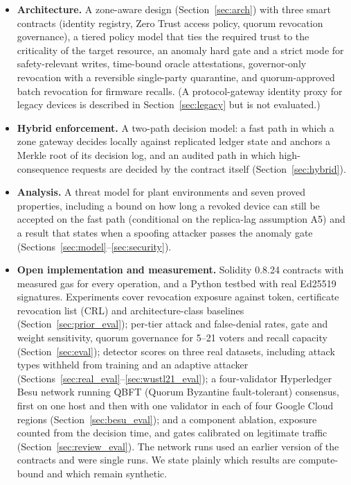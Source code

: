 \begin{itemize}[leftmargin=1.1em,itemsep=0pt,topsep=1pt]
  \item \textbf{Architecture.} A zone-aware design (Section~\ref{sec:arch}) with three smart contracts (identity registry, Zero Trust access policy, quorum revocation governance), a tiered policy model that ties the required trust to the criticality of the target resource, an anomaly hard gate and a strict mode for safety-relevant writes, time-bound oracle attestations, governor-only revocation with a reversible single-party quarantine, and quorum-approved batch revocation for firmware recalls. (A protocol-gateway identity proxy for legacy devices is described in Section~\ref{sec:legacy} but is not evaluated.)
  \item \textbf{Hybrid enforcement.} A two-path decision model: a fast path in which a zone gateway decides locally against replicated ledger state and anchors a Merkle root of its decision log, and an audited path in which high-consequence requests are decided by the contract itself (Section~\ref{sec:hybrid}).
  \item \textbf{Analysis.} A threat model for plant environments and seven proved properties, including a bound on how long a revoked device can still be accepted on the fast path (conditional on the replica-lag assumption A5) and a result that states when a spoofing attacker passes the anomaly gate (Sections~\ref{sec:model}--\ref{sec:security}).
  \item \textbf{Open implementation and measurement.} Solidity 0.8.24 contracts with measured gas for every operation, and a Python testbed with real Ed25519 signatures. Experiments cover revocation exposure against token, certificate revocation list (CRL) and architecture-class baselines (Section~\ref{sec:prior_eval}); per-tier attack and false-denial rates, gate and weight sensitivity, quorum governance for 5--21 voters and recall capacity (Section~\ref{sec:eval}); detector scores on three real datasets, including attack types withheld from training and an adaptive attacker (Sections~\ref{sec:real_eval}--\ref{sec:wustl21_eval}); a four-validator Hyperledger Besu network running QBFT (Quorum Byzantine fault-tolerant) consensus, first on one host and then with one validator in each of four Google Cloud regions (Section~\ref{sec:besu_eval}); and a component ablation, exposure counted from the decision time, and gates calibrated on legitimate traffic (Section~\ref{sec:review_eval}). The network runs used an earlier version of the contracts and were single runs. We state plainly which results are compute-bound and which remain synthetic.
\end{itemize}
